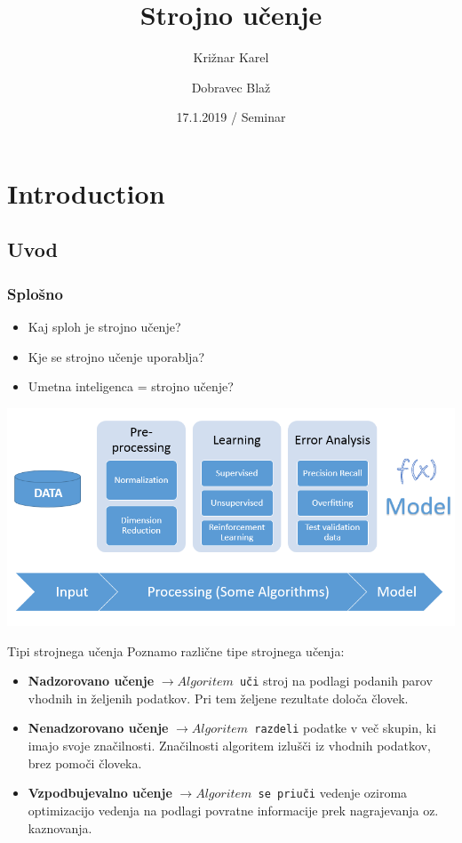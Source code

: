 \documentclass{beamer}
\title[Strojno učenje] 
{Strojno učenje}
\author[Križnar Karel, Dobravec Blaž]
{Križnar Karel \and Dobravec Blaž}
\institute
{
  Praktična matematika\\
  Fakulteta za matematiko in fiziko
}
\date
{17.1.2019 / Seminar}
\begin{document}
\begin{frame}
  \titlepage
\end{frame}





\section{Introduction}

\subsection[uvod]{Uvod}

\begin{frame}
\frametitle[alignment=center]{Splošno} %
  \begin{itemize}
  \item
    Kaj sploh je strojno učenje?
  \item
    Kje se strojno učenje uporablja?
  \item
    Umetna inteligenca = strojno učenje?
  \end{itemize}
\bigskip
\includegraphics[scale = 0.3]{photo/ucenje_proces}
\end{frame}

\begin{frame}{Tipi strojnega učenja}
\bigskip
  Poznamo različne tipe strojnega učenja: \smallskip

  \begin{itemize}
  \item 
    \textbf{Nadzorovano učenje} $\rightarrow Algoritem $\texttt{ uči}  stroj na podlagi podanih parov vhodnih in željenih podatkov. Pri tem željene rezultate določa človek.
  \item 
     \textbf{Nenadzorovano učenje} $\rightarrow  Algoritem $\texttt{ razdeli} podatke v več skupin, ki imajo svoje značilnosti. Značilnosti algoritem izlušči iz vhodnih podatkov, brez pomoči človeka.
  \item 
     \textbf{Vzpodbujevalno učenje} $\rightarrow Algoritem $\texttt{ se priuči} vedenje oziroma optimizacijo vedenja na podlagi povratne informacije prek nagrajevanja oz. kaznovanja.
  \end{itemize}
\end{frame}
\end{document}
